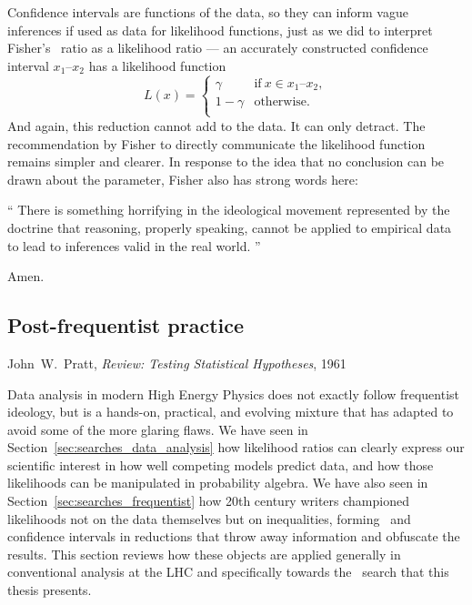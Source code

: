Confidence intervals are functions of the data, so they can inform vague
inferences if used as data for likelihood functions, just as we did to
interpret Fisher's \pvalue\ ratio as a likelihood ratio ---
an accurately constructed confidence interval $x_1\textrm{--}x_2$ has a
likelihood function
\begin{equation}
L(x) =
\left\{
\begin{matrix}
\gamma & \textrm{if}~x \in x_1\textrm{--}x_2, \\
1 - \gamma & \textrm{otherwise.} \\
\end{matrix}
\right.
\end{equation}
And again, this reduction cannot add to the data.
It can only detract.
The recommendation by Fisher to directly communicate the likelihood function
remains simpler and clearer.
In response to the idea that no conclusion can be drawn about the parameter,
Fisher also has strong words here:
\begin{displayquote}
\small
``%
There is something horrifying in the ideological movement represented by the
doctrine that reasoning, properly speaking, cannot be applied to empirical data
to lead to inferences valid in the real world.%
''~\cite{fisher1956statistical}
\end{displayquote}
Amen.

\begin{singlespacing}
\section{Post-frequentist practice}
\label{sec:searches_practice}
\begin{epigraphs}
%
{John~W.~Pratt,
\textit{Review: Testing Statistical Hypotheses},
1961~\cite{pratt1961testing}}
\end{epigraphs}
\end{singlespacing}

Data analysis in modern High Energy Physics does not exactly follow frequentist
ideology, but is a hands-on, practical, and evolving mixture that has adapted
to avoid some of the more glaring flaws.
We have seen in Section~\ref{sec:searches_data_analysis} how likelihood ratios
can clearly express our scientific interest in how well competing models
predict data, and how those likelihoods can be manipulated in probability
algebra.
We have also seen in Section~\ref{sec:searches_frequentist} how 20th century
writers championed likelihoods not on the data themselves but on inequalities,
forming \pvalues\ and confidence intervals in reductions that throw away
information and obfuscate the results.
This section reviews how these objects are applied generally in conventional
analysis at the LHC and specifically towards the \atlas\ search that this
thesis presents.


